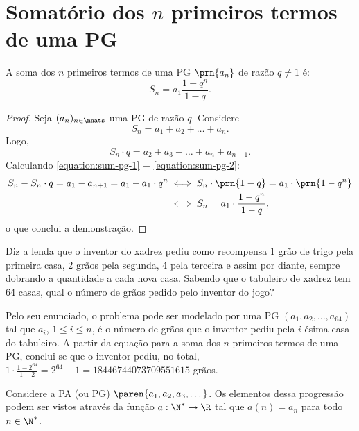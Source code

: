 \section{Somatório dos $n$ primeiros termos de uma PG}

\begin{proposition}
A soma dos $n$ primeiros termos de uma PG $\prn {a_n}$ de razão $q \ne 1$ é:
\begin{equation*}
S_n = a_1 \frac{1-q^n}{1-q}.
\end{equation*}
\end{proposition}

\begin{proof}
Seja $(a_n)_{n \in \nnats}$ uma PG de razão $q$. Considere
%
\begin{equation}
\label{equation:sum-pg-1}
S_n = a_1 + a_2 + \dots + a_n.
\end{equation}
%
Logo, 
%
\begin{equation}
\label{equation:sum-pg-2}
S_n \cdot q = a_2 + a_3 + \dots + a_n + a_{n+1}.
\end{equation}
%
Calculando \ref{equation:sum-pg-1} $-$ \ref{equation:sum-pg-2}:
%
\begin{align*}
S_n - S_n \cdot q = a_1 - a_{n+1} = a_1 - a_1 \cdot q^n & \iff S_n\cdot\prn{1-q} = a_1\cdot\prn{1-q^n} \\ &\iff S_n = a_1 \cdot \frac{1-q^n}{1-q},
\end{align*}
%
\noindent o que conclui a demonstração.

\end{proof}

\begin{example}
Diz a lenda que o inventor do xadrez pediu como recompensa 1 grão de trigo pela primeira casa, 2 grãos pela segunda, 4 pela terceira e assim por diante, sempre dobrando a quantidade a cada nova casa. 
Sabendo que o tabuleiro de xadrez tem 64 casas, qual o número de grãos pedido pelo inventor do jogo?
\end{example}

\begin{solution}
Pelo seu enunciado, o problema pode ser modelado por uma PG $(a_1, a_2, \dots, a_{64})$ tal que $a_i$, $1 \le i \le n$, é o número de grãos que o inventor pediu pela $i$-ésima casa do tabuleiro.
A partir da equação para a soma dos $n$ primeiros termos de uma PG, conclui-se que o inventor pediu, no total, $1 \cdot \frac {1 - 2^{64}} {1-2} = 2^{64}-1 = 18446744073709551615$ grãos.
\end{solution}

{
Considere a PA (ou PG) $\paren{a_1, a_2, a_3 , \dots}$. Os elementos
dessa progressão podem ser vistos através da função $a: \N^\ast \to
\R$ tal que $a(n) = a_n$ para todo $n \in \N^\ast$.
}